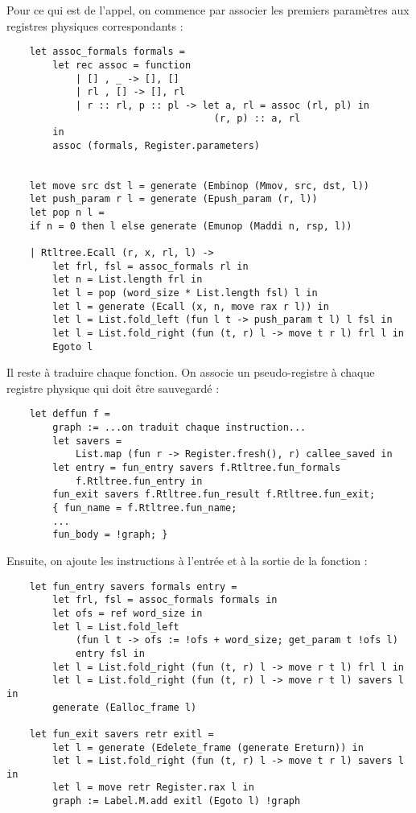 \documentclass{cours}
\begin{document}
Pour ce qui est de l'appel, on commence par associer les premiers paramètres aux registres physiques correspondants :
\begin{verbatim}
    let assoc_formals formals =
        let rec assoc = function
            | [] , _ -> [], []
            | rl , [] -> [], rl
            | r :: rl, p :: pl -> let a, rl = assoc (rl, pl) in
                                    (r, p) :: a, rl
        in
        assoc (formals, Register.parameters)


    let move src dst l = generate (Embinop (Mmov, src, dst, l))
    let push_param r l = generate (Epush_param (r, l))
    let pop n l =
    if n = 0 then l else generate (Emunop (Maddi n, rsp, l))

    | Rtltree.Ecall (r, x, rl, l) ->
        let frl, fsl = assoc_formals rl in
        let n = List.length frl in
        let l = pop (word_size * List.length fsl) l in
        let l = generate (Ecall (x, n, move rax r l)) in
        let l = List.fold_left (fun l t -> push_param t l) l fsl in
        let l = List.fold_right (fun (t, r) l -> move t r l) frl l in
        Egoto l
\end{verbatim}
Il reste à traduire chaque fonction. On associe un pseudo-registre à chaque registre physique qui doit être sauvegardé :
\begin{verbatim}
    let deffun f =
        graph := ...on traduit chaque instruction...
        let savers =
            List.map (fun r -> Register.fresh(), r) callee_saved in
        let entry = fun_entry savers f.Rtltree.fun_formals
            f.Rtltree.fun_entry in
        fun_exit savers f.Rtltree.fun_result f.Rtltree.fun_exit;
        { fun_name = f.Rtltree.fun_name;
        ...
        fun_body = !graph; }
\end{verbatim}
Ensuite, on ajoute les instructions à l'entrée et à la sortie de la fonction :
\begin{verbatim}
    let fun_entry savers formals entry =
        let frl, fsl = assoc_formals formals in
        let ofs = ref word_size in
        let l = List.fold_left
            (fun l t -> ofs := !ofs + word_size; get_param t !ofs l)
            entry fsl in
        let l = List.fold_right (fun (t, r) l -> move r t l) frl l in
        let l = List.fold_right (fun (t, r) l -> move r t l) savers l in
        generate (Ealloc_frame l)

    let fun_exit savers retr exitl =
        let l = generate (Edelete_frame (generate Ereturn)) in
        let l = List.fold_right (fun (t, r) l -> move t r l) savers l in
        let l = move retr Register.rax l in
        graph := Label.M.add exitl (Egoto l) !graph
\end{verbatim}
\end{document}
